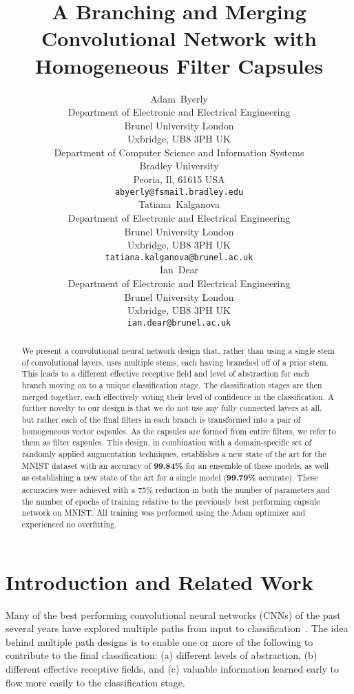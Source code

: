 \documentclass{article}
\date{} \renewcommand{\undertitle}{} \renewcommand{\headeright}{}
\title{A Branching and Merging Convolutional Network with Homogeneous Filter Capsules}
\author{
  Adam~Byerly\\
  Department of Electronic and Electrical Engineering\\
  Brunel University London\\
  Uxbridge, UB8 3PH UK \\
  Department of Computer Science and Information Systems\\
  Bradley University\\
  Peoria, Il, 61615 USA\\
  \texttt{abyerly@fsmail.bradley.edu} \\
  \And{}
  Tatiana~Kalganova \\
  Department of Electronic and Electrical Engineering\\
  Brunel University London\\
  Uxbridge, UB8 3PH UK \\
  \texttt{tatiana.kalganova@brunel.ac.uk} \\
  \And{}
  Ian~Dear \\
  Department of Electronic and Electrical Engineering\\
  Brunel University London\\
  Uxbridge, UB8 3PH UK \\
  \texttt{ian.dear@brunel.ac.uk}
}
\begin{document}
\maketitle

\begin{abstract}
We present a convolutional neural network design that, rather than using a single stem of convolutional layers, uses multiple stems, each having branched off of a prior stem.  This leads to a different effective receptive field and level of abstraction for each branch moving on to a unique classification stage.  The classification stages are then merged together, each effectively voting their level of confidence in the classification.  A further novelty to our design is that we do not use any fully connected layers at all, but rather each of the final filters in each branch is transformed into a pair of homogeneous vector capsules.  As the capsules are formed from entire filters, we refer to them as filter capsules.  This design, in combination with a domain-specific set of randomly applied augmentation techniques, establishes a new state of the art for the MNIST dataset with an accuracy of \textbf{99.84\%} for an ensemble of these models, as well as establishing a new state of the art for a single model (\textbf{99.79\%} accurate).  These accuracies were achieved with a 75\% reduction in both the number of parameters and the number of epochs of training relative to the previously best performing capsule network on MNIST\@.  All training was performed using the Adam optimizer and experienced no overfitting.
\end{abstract}

  
\section{Introduction and Related Work}\label{sec:introduction}

Many of the best performing convolutional neural networks (CNNs) of the past several years have explored multiple paths from input to classification~\cite{Szegedy2015a}\cite{Szegedy2015b}\cite{He2015}\cite{Zhou2020}\cite{Wang2020}\cite{Ciresan2012}.  The idea behind multiple path designs is to enable one or more of the following to contribute to the final classification: (a) different levels of abstraction, (b) different effective receptive fields, and (c) valuable information learned early to flow more easily to the classification stage.
\end{document}
